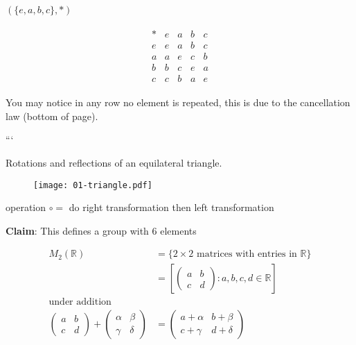 \begin{example}
\protect\hypertarget{exm:nine}{}\label{exm:nine}\((\{e, a, b, c\}, *)\)

\begin{align*}
    \begin{array}{c|cccc}
        * & e & a & b & c \\
        \hline
        e & e & a & b & c \\
        a & a & e & c & b \\
        b & b & c & e & a \\
        c & c & b & a & e
    \end{array} 
\end{align*}

You may notice in any row no element is repeated, this is due to the cancellation law (bottom of page).
\end{example}

```

\begin{example}
\protect\hypertarget{exm:triangle}{}\label{exm:triangle}Rotations and reflections of an equilateral triangle.


\begin{figure}
  \centering
  \texttt{[image: 01-triangle.pdf]}
\end{figure}

operation \(\circ =\) do right transformation then left transformation

\textbf{Claim}: This defines a group with 6 elements
\end{example}

\begin{example}
\begin{align*}
    M_2(\mathbb{R}) &= \{ 2 \times 2 \text{ matrices with entries in } \mathbb{R} \} \\
    &= \left[ \begin{pmatrix} a & b \\ c & d \end{pmatrix} : a, b, c, d \in \mathbb{R} \right] \\
    \text{under addition} \\
    \begin{pmatrix}
    a & b \\
    c & d
    \end{pmatrix} + 
    \begin{pmatrix}
    \alpha & \beta \\
    \gamma & \delta
    \end{pmatrix} &=
    \begin{pmatrix}
    a + \alpha & b + \beta \\
    c + \gamma & d + \delta
    \end{pmatrix}
\end{align*}
\end{example}

